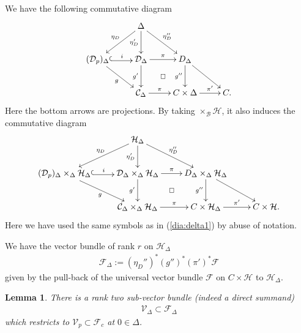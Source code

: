 \documentclass[11pt,oneside,a4paper,mathscr]{amsart}
\makeatletter
\newtheorem{lemma}[thm]{Lemma}
\theoremstyle{definition}
\newcommand{\cH}{\mathcal{H}}
\newcommand{\cB}{\mathcal{B}}
\newcommand{\cC}{\mathcal{C}}
\newcommand{\cF}{\mathcal{F}}
\newcommand{\cD}{\mathcal{D}}
\newcommand{\diasquare}{\ar@{}[rd]|\square}
\newcommand{\inclusion}{\ar@<-0.3ex>@{^{(}->}[r]}
\makeatother
\begin{document}
We have the following commutative diagram 
\begin{align}\label{dia:delta1}
    \xymatrix{
& \Delta \ar[d]_-{\eta_D'} \ar[rd]^-{\eta_D''} \ar[ld]_-{\eta_D} & &\\
(\cD_{p})_{\Delta} \inclusion^-{i} \ar[rd]_-{g} & \cD_{\Delta} \ar[r]^-{\pi}\ar[d]_-{g'} \diasquare & D_{\Delta}  \ar[d]_-{g''} \ar[rd] & \\
& \cC_{\Delta} \ar[r]^-{\pi} & C\times \Delta \ar[r]^-{\pi'} &
C.       }
\end{align}
Here the bottom arrows are projections. 
By taking $\times_{\cB}\cH$, it also induces the commutative diagram 
\begin{align}\label{dia:delta2}
    \xymatrix{
& \cH_{\Delta} \ar[d]_-{\eta_D'} \ar[rd]^-{\eta_D''} \ar[ld]_-{\eta_D} & &\\
(\cD_{p})_{\Delta}\times_{\Delta}\cH_{\Delta} \inclusion^-{i} \ar[rd]_-{g} & \cD_{\Delta}\times_{\Delta}\cH_{\Delta} \ar[r]^-{\pi}\ar[d]_-{g'} \diasquare & D_{\Delta}\times_{\Delta}\cH_{\Delta}  \ar[d]_-{g''} \ar[rd] & \\
& \cC_{\Delta}\times_{\Delta}\cH_{\Delta} \ar[r]^-{\pi} & C\times \cH_{\Delta} \ar[r]^-{\pi'} &
C \times \cH.       }
\end{align}
Here we have used the same symbols as in (\ref{dia:delta1}) by abuse of notation. 

We have the vector bundle of rank $r$ on $\cH_{\Delta}$
\begin{align*}
  \mathcal{F}_{\Delta}
  :=
  (\eta_D'')^*(g'')^*(\pi')^*\cF
\end{align*}
given by the pull-back of the universal vector bundle $\cF$ on $C \times \cH$ to $\cH_{\Delta}$.

\begin{lemma}\label{lem:Vdelta}
There is a rank two sub-vector bundle (indeed a direct summand) 
\begin{align*}
  \mathcal{V}_{\Delta} \subset \mathcal{F}_{\Delta}
\end{align*}
which restricts to $\mathcal{V}_p \subset \cF_c$ at $0 \in \Delta$.
\end{lemma}
\end{document}
